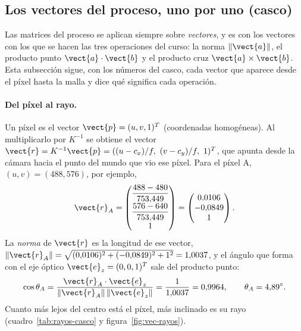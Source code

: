 
\subsection{Los vectores del proceso, uno por uno (casco)}\label{sec:vectores-casco}

Las matrices del proceso se aplican siempre sobre \emph{vectores}, y es con los vectores con los que se hacen las tres operaciones
del curso: la norma $\lVert\vect{a}\rVert$, el producto punto $\vect{a}\cdot\vect{b}$ y el producto cruz $\vect{a}\times\vect{b}$.
Esta subsección sigue, con los números del casco, cada vector que aparece desde el píxel hasta la malla y dice qué significa cada operación.

\paragraph{Del píxel al rayo.} Un píxel es el vector $\vect{p}=(u,v,1)^{T}$ (coordenadas homogéneas). Al multiplicarlo por $K^{-1}$ se obtiene
el vector $\vect{r}=K^{-1}\vect{p}=((u-c_x)/f,\ (v-c_y)/f,\ 1)^{T}$, que apunta desde la cámara hacia el punto del mundo que vio ese píxel. Para
el píxel A, $(u,v)=(488,576)$, por ejemplo,
\begin{equation}
\vect{r}_A=\begin{pmatrix}\dfrac{488-480}{753{,}449}\\[2mm]\dfrac{576-640}{753{,}449}\\[1mm]1\end{pmatrix}=\begin{pmatrix} 0{,}0106 \\ -0{,}0849 \\ 1 \end{pmatrix} .
\end{equation}
La \emph{norma} de $\vect{r}$ es la longitud de ese vector, $\lVert\vect{r}_A\rVert=\sqrt{(0{,}0106)^2+(-0{,}0849)^2+1^2}=1{,}0037$, y el ángulo
que forma con el eje óptico $\vect{e}_z=(0,0,1)^{T}$ sale del producto punto:
\begin{equation}
\cos\theta_A=\frac{\vect{r}_A\cdot\vect{e}_z}{\lVert\vect{r}_A\rVert\,\lVert\vect{e}_z\rVert}=\frac{1}{1{,}0037}=0{,}9964,\qquad \theta_A=4{,}89^\circ .
\end{equation}
Cuanto más lejos del centro está el píxel, más inclinado es su rayo (cuadro~\ref{tab:rayos-casco} y figura~\ref{fig:vec-rayos}).

